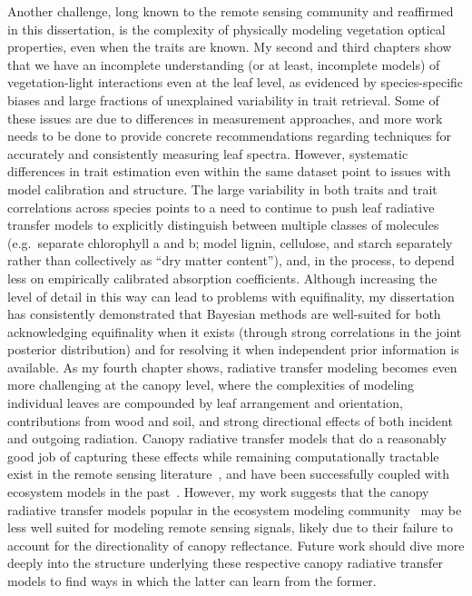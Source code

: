 Another challenge, long known to the remote sensing community and reaffirmed in this dissertation, is the complexity of physically modeling vegetation optical properties, even when the traits are known.
My second and third chapters show that we have an incomplete understanding (or at least, incomplete models) of vegetation-light interactions even at the leaf level, as evidenced by species-specific biases and large fractions of unexplained variability in trait retrieval.
Some of these issues are due to differences in measurement approaches, and more work needs to be done to provide concrete recommendations regarding techniques for accurately and consistently measuring leaf spectra.
However, systematic differences in trait estimation even within the same dataset point to issues with model calibration and structure.
The large variability in both traits and trait correlations across species points to a need to continue to push leaf radiative transfer models to explicitly distinguish between multiple classes of molecules (e.g.\ separate chlorophyll a and b; model lignin, cellulose, and starch separately rather than collectively as ``dry matter content''), and, in the process, to depend less on empirically calibrated absorption coefficients.
Although increasing the level of detail in this way can lead to problems with equifinality, my dissertation has consistently demonstrated that Bayesian methods are well-suited for both acknowledging equifinality when it exists (through strong correlations in the joint posterior distribution) and for resolving it when independent prior information is available.
As my fourth chapter shows, radiative transfer modeling becomes even more challenging at the canopy level, where the complexities of modeling individual leaves are compounded by leaf arrangement and orientation, contributions from wood and soil, and strong directional effects of both incident and outgoing radiation.
Canopy radiative transfer models that do a reasonably good job of capturing these effects while remaining computationally tractable exist in the remote sensing literature~\cite{verhoef_1984_sail,pinty_2006_simplifying}, and have been successfully coupled with ecosystem models in the past~\cite{quaife_2008_assimilating}.
However, my work suggests that the canopy radiative transfer models popular in the ecosystem modeling community~\cite{dickinson_1983_land,SELLERS_1985_canopy} may be less well suited for modeling remote sensing signals, likely due to their failure to account for the directionality of canopy reflectance. 
Future work should dive more deeply into the structure underlying these respective canopy radiative transfer models to find ways in which the latter can learn from the former.

